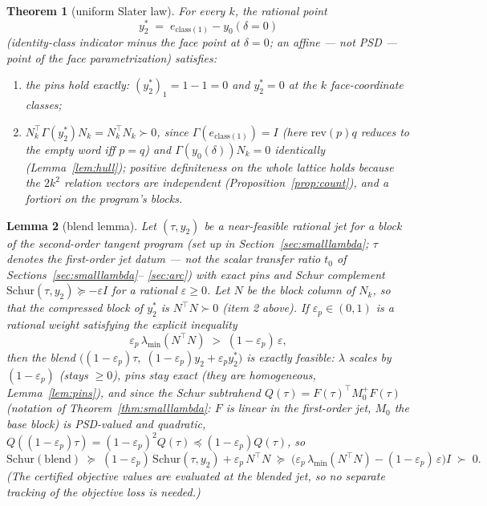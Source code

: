 \documentclass[11pt]{article}
\newtheorem{theorem}{Theorem}[section]
\newtheorem{lemma}[theorem]{Lemma}
\newcommand{\eps}{\varepsilon}
\newcommand{\lam}{\lambda}
\begin{document}
\begin{theorem}[uniform Slater law]\label{thm:L4}
For every $k$, the rational point
\[
y_2^\ast\;=\;e_{\mathrm{class}(1)}-y_0(\delta=0)
\]
(identity-class indicator minus the face point at $\delta=0$; an affine ---
not PSD --- point of the face parametrization) satisfies:
\begin{enumerate}
\item the pins hold exactly: $(y_2^\ast)_1=1-1=0$ and $y_2^\ast=0$ at the
  $k$ face-coordinate classes;
\item $N_k^\top\Gamma(y_2^\ast)N_k=N_k^\top N_k\succ0$, since
  $\Gamma(e_{\mathrm{class}(1)})=I$ (here $\mathrm{rev}(p)q$ reduces to the
  empty word iff $p=q$) and $\Gamma(y_0(\delta))N_k=0$ identically
  (Lemma~\ref{lem:hull}); positive definiteness on the whole lattice holds
  because the $2k^2$ relation vectors are independent
  (Proposition~\ref{prop:count}), and a fortiori on the program's blocks.
\end{enumerate}
\end{theorem}

\begin{lemma}[blend lemma]\label{lem:blend}
Let $(\tau,y_2)$ be a near-feasible rational jet for a block of the
second-order tangent program (set up in
Section~\ref{sec:smalllambda}; $\tau$ denotes the first-order jet datum ---
not the scalar transfer ratio $t_0$ of Sections~\ref{sec:smalllambda}--%
\ref{sec:arc}) with exact pins and Schur complement
$\mathrm{Schur}(\tau,y_2)\succeq-\eps I$ for a rational $\eps\ge0$. Let
$N$ be the block column of $N_k$, so that the compressed block of
$y_2^\ast$ is $N^\top N\succ0$ (item 2 above). If $\eps_p\in(0,1)$ is a
rational weight satisfying the explicit inequality
\[
\eps_p\,\lambda_{\min}(N^\top N)\;>\;(1-\eps_p)\,\eps,
\]
then the blend
$\bigl((1-\eps_p)\tau,\;(1-\eps_p)y_2+\eps_p y_2^\ast\bigr)$ is exactly
feasible: $\lam$ scales by $(1-\eps_p)$ (stays $\ge0$), pins stay exact
(they are homogeneous, Lemma~\ref{lem:pins}), and since the Schur
subtrahend $Q(\tau)=F(\tau)^\top M_0^{+}F(\tau)$ (notation of
Theorem~\ref{thm:smalllambda}: $F$ is linear in the first-order jet, $M_0$
the base block) is PSD-valued and quadratic,
$Q((1-\eps_p)\tau)=(1-\eps_p)^2Q(\tau)\preceq(1-\eps_p)Q(\tau)$, so
\[
\mathrm{Schur}(\text{blend})\;\succeq\;(1-\eps_p)\,\mathrm{Schur}(\tau,y_2)
+\eps_p\,N^\top N\;\succeq\;
\bigl(\eps_p\,\lambda_{\min}(N^\top N)-(1-\eps_p)\,\eps\bigr)I\;\succ\;0 .
\]
(The certified objective values are evaluated \emph{at} the blended jet,
so no separate tracking of the objective loss is needed.)
\end{lemma}
\end{document}
